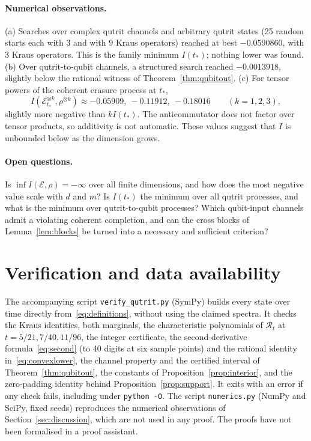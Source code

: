 \documentclass[11pt,a4paper]{article}
\theoremstyle{definition}\newtheorem{definition}[theorem]{Definition}
\theoremstyle{remark}\newtheorem{remark}[theorem]{Remark}
\newcommand{\E}{\mathcal E}
\newcommand{\R}{\mathcal R}
\begin{document}
\paragraph{Numerical observations.} (a) Searches over complex qutrit channels and arbitrary qutrit states (25 random starts each with $3$ and with $9$ Kraus operators) reached at best $-0.0590860$, with $3$ Kraus operators. This is the family minimum $I(t_*)$; nothing lower was found. (b) Over qutrit-to-qubit channels, a structured search reached $-0.0013918$, slightly below the rational witness of Theorem~\ref{thm:qubitout}. (c) For tensor powers of the coherent erasure process at $t_*$,
\[
 I(\E_{t_*}^{\otimes k},\rho^{\otimes k})\approx-0.05909,\ -0.11912,\ -0.18016\qquad(k=1,2,3),
\]
slightly more negative than $kI(t_*)$. The anticommutator does not factor over tensor products, so additivity is not automatic. These values suggest that $I$ is unbounded below as the dimension grows.

\paragraph{Open questions.} Is $\inf I(\E,\rho)=-\infty$ over all finite dimensions, and how does the most negative value scale with $d$ and $m$? Is $I(t_*)$ the minimum over all qutrit processes, and what is the minimum over qutrit-to-qubit processes? Which qubit-input channels admit a violating coherent completion, and can the cross blocks of Lemma~\ref{lem:blocks} be turned into a necessary and sufficient criterion?

\section*{Verification and data availability}
The accompanying script \texttt{verify\_qutrit.py} (SymPy) builds every state over time directly from~\eqref{eq:definitions}, without using the claimed spectra. It checks the Kraus identities, both marginals, the characteristic polynomials of $\R_t$ at $t=5/21,7/40,11/96$, the integer certificate, the second-derivative formula~\eqref{eq:second} (to 40 digits at six sample points) and the rational identity in~\eqref{eq:convexlower}, the channel property and the certified interval of Theorem~\ref{thm:qubitout}, the constants of Proposition~\ref{prop:interior}, and the zero-padding identity behind Proposition~\ref{prop:support}. It exits with an error if any check fails, including under \texttt{python -O}. The script \texttt{numerics.py} (NumPy and SciPy, fixed seeds) reproduces the numerical observations of Section~\ref{sec:discussion}, which are not used in any proof. The proofs have not been formalised in a proof assistant.
\end{document}
